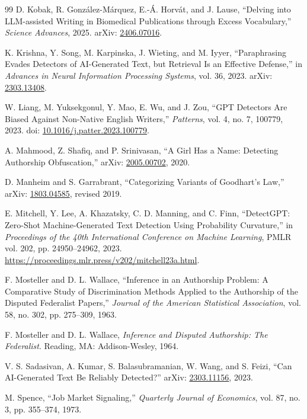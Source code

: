 \documentclass[11pt]{article}
\theoremstyle{plain}
\theoremstyle{definition}
\theoremstyle{remark}
\begin{document}
\begin{thebibliography}{99}
D. Kobak, R. Gonz\'alez-M\'arquez, E.-\'A. Horv\'at, and J. Lause,
``Delving into LLM-assisted Writing in Biomedical Publications through Excess Vocabulary,''
\emph{Science Advances}, 2025. arXiv: \href{https://arxiv.org/abs/2406.07016}{2406.07016}.

K. Krishna, Y. Song, M. Karpinska, J. Wieting, and M. Iyyer,
``Paraphrasing Evades Detectors of AI-Generated Text, but Retrieval Is an Effective Defense,''
in \emph{Advances in Neural Information Processing Systems}, vol. 36, 2023.
arXiv: \href{https://arxiv.org/abs/2303.13408}{2303.13408}.

W. Liang, M. Yuksekgonul, Y. Mao, E. Wu, and J. Zou,
``GPT Detectors Are Biased Against Non-Native English Writers,''
\emph{Patterns}, vol. 4, no. 7, 100779, 2023.
doi: \href{https://doi.org/10.1016/j.patter.2023.100779}{10.1016/j.patter.2023.100779}.

A. Mahmood, Z. Shafiq, and P. Srinivasan,
``A Girl Has a Name: Detecting Authorship Obfuscation,''
arXiv: \href{https://arxiv.org/abs/2005.00702}{2005.00702}, 2020.

D. Manheim and S. Garrabrant,
``Categorizing Variants of Goodhart's Law,''
arXiv: \href{https://arxiv.org/abs/1803.04585}{1803.04585}, revised 2019.

E. Mitchell, Y. Lee, A. Khazatsky, C. D. Manning, and C. Finn,
``DetectGPT: Zero-Shot Machine-Generated Text Detection Using Probability Curvature,''
in \emph{Proceedings of the 40th International Conference on Machine Learning}, PMLR vol. 202, pp. 24950--24962, 2023.
\url{https://proceedings.mlr.press/v202/mitchell23a.html}.

F. Mosteller and D. L. Wallace,
``Inference in an Authorship Problem: A Comparative Study of Discrimination Methods Applied to the Authorship of the Disputed Federalist Papers,''
\emph{Journal of the American Statistical Association}, vol. 58, no. 302, pp. 275--309, 1963.

F. Mosteller and D. L. Wallace,
\emph{Inference and Disputed Authorship: The Federalist}.
Reading, MA: Addison-Wesley, 1964.

V. S. Sadasivan, A. Kumar, S. Balasubramanian, W. Wang, and S. Feizi,
``Can AI-Generated Text Be Reliably Detected?''
arXiv: \href{https://arxiv.org/abs/2303.11156}{2303.11156}, 2023.

M. Spence,
``Job Market Signaling,''
\emph{Quarterly Journal of Economics}, vol. 87, no. 3, pp. 355--374, 1973.


\end{thebibliography}
\end{document}
